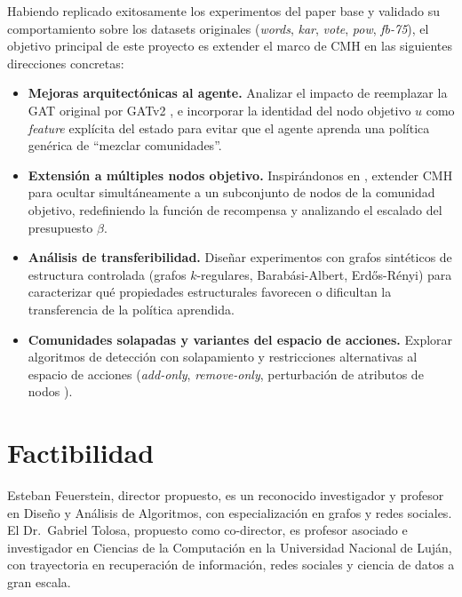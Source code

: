 \documentclass[11pt,a4paper]{article}
\begin{document}
Habiendo replicado exitosamente los experimentos del paper base \cite{bernini-2024} y validado su comportamiento sobre los datasets originales (\textit{words}, \textit{kar}, \textit{vote}, \textit{pow}, \textit{fb-75}), el objetivo principal de este proyecto es extender el marco de CMH en las siguientes direcciones concretas:

\begin{itemize}[leftmargin=*, label=\textbullet, itemsep=0.3em, topsep=0pt]

    \item \textbf{Mejoras arquitectónicas al agente.}
    Analizar el impacto de reemplazar la GAT original por GATv2 \cite{brody2022attentivegraphattentionnetworks}, e incorporar la identidad del nodo objetivo $u$ como \textit{feature} explícita del estado para evitar que el agente aprenda una política genérica de ``mezclar comunidades''.

    \item \textbf{Extensión a múltiples nodos objetivo.}
    Inspirándonos en \textcite{8118127}, extender CMH para ocultar simultáneamente a un subconjunto de nodos de la comunidad objetivo, redefiniendo la función de recompensa y analizando el escalado del presupuesto $\beta$.

    \item \textbf{Análisis de transferibilidad.}
    Diseñar experimentos con grafos sintéticos de estructura controlada (grafos $k$-regulares, Barabási-Albert, Erdős-Rényi) para caracterizar qué propiedades estructurales favorecen o dificultan la transferencia de la política aprendida.

    \item \textbf{Comunidades solapadas y variantes del espacio de acciones.}
    Explorar algoritmos de detección con solapamiento \cite{Xie_2013} y restricciones alternativas al espacio de acciones (\textit{add-only}, \textit{remove-only}, perturbación de atributos de nodos \cite{Yang_2013}).

\end{itemize}

\section*{Factibilidad}

Esteban Feuerstein, director propuesto, es un reconocido investigador y profesor en Diseño y Análisis de Algoritmos, con especialización en grafos y redes sociales.
El Dr.\ Gabriel Tolosa, propuesto como co-director, es profesor asociado e investigador en Ciencias de la Computación en la Universidad Nacional de Luján, con trayectoria en recuperación de información, redes sociales y ciencia de datos a gran escala.
\end{document}
